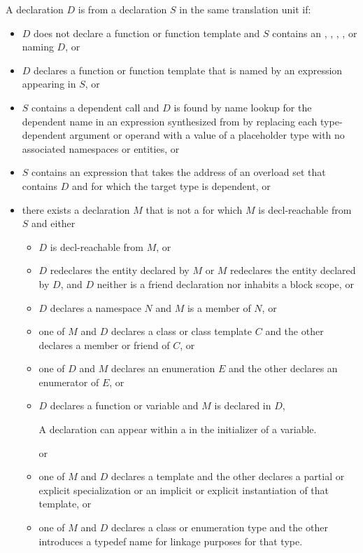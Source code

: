 \pnum
A declaration $D$ is  from a declaration $S$
in the same translation unit if:
\begin{itemize}
\item
$D$ does not declare a function or function template and
$S$ contains an
,
,
,
, or
naming $D$, or

\item
$D$ declares a function or function template that
is named by an expression
appearing in $S$, or

\item
$S$ contains a dependent call 
and $D$ is found by name lookup for the dependent name
in an expression synthesized from 
by replacing each type-dependent argument or operand
with a value of a placeholder type
with no associated namespaces or entities, or

\item
$S$ contains an expression that
takes the address of an overload set
that contains $D$ and
for which the target type is dependent, or

\item
there exists a declaration $M$ that is not a 
for which $M$ is decl-reachable from $S$ and either
\begin{itemize}
\item
$D$ is decl-reachable from $M$, or
\item
$D$ redeclares the entity declared by $M$ or
$M$ redeclares the entity declared by $D$,
and $D$ neither is a friend declaration
nor inhabits a block scope, or
\item
$D$ declares a namespace $N$ and $M$ is a member of $N$, or
\item
one of $M$ and $D$ declares a class or class template $C$
and the other declares a member or friend of $C$, or
\item
one of $D$ and $M$ declares an enumeration $E$
and the other declares an enumerator of $E$, or
\item
$D$ declares a function or variable and $M$ is declared in $D$,
\begin{footnote}
A declaration can appear within a 
in the initializer of a variable.
\end{footnote}
or
\item
one of $M$ and $D$ declares a template and the other declares
a partial or explicit specialization or
an implicit or explicit instantiation of that template, or
\item
one of $M$ and $D$ declares a class or enumeration type
and the other introduces a typedef name for linkage purposes for that type.
\end{itemize}
\end{itemize}
